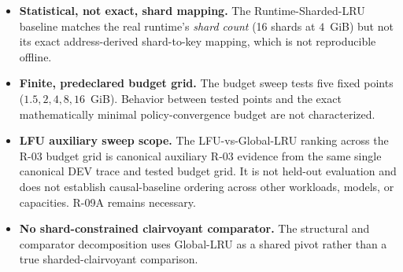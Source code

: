 \begin{itemize}
   $B-C^*$; $O^* \le O_B$ is known, but $O_B$ and $C^*$ have no guaranteed
   ordering.
 \item \textbf{Statistical, not exact, shard mapping.} The
   Runtime-Sharded-LRU baseline matches the real runtime's \emph{shard
   count} (16 shards at $4$~GiB) but not its exact address-derived
   shard-to-key mapping, which is not reproducible offline.
 \item \textbf{Finite, predeclared budget grid.} The budget sweep
   tests five fixed points ($1.5, 2, 4, 8, 16$~GiB). Behavior between
   tested points and the exact mathematically minimal policy-convergence
   budget are not characterized.
 \item \textbf{LFU auxiliary sweep scope.} The LFU-vs-Global-LRU ranking
   across the R-03 budget grid is canonical auxiliary R-03 evidence from
   the same single canonical DEV trace and tested budget grid. It is not
   held-out evaluation and does not establish causal-baseline ordering
   across other workloads, models, or capacities. R-09A remains necessary.
 \item \textbf{No shard-constrained clairvoyant comparator.} The
   structural and comparator decomposition uses Global-LRU as a shared
   pivot rather than a true sharded-clairvoyant comparison.
\end{itemize}

